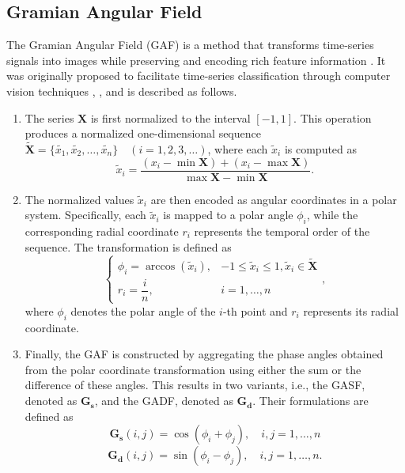\documentclass[anonymous]{iopjournal}
\begin{document}
\subsection{Gramian Angular Field}
The Gramian Angular Field (GAF) is a method that transforms time-series signals into images while preserving and encoding rich feature information \cite{11048665}. It was originally proposed to facilitate time-series classification through computer vision techniques \cite{10114345}, \cite{10281942}, and is described as follows.
\begin{enumerate}
\item The series $\boldsymbol{X}$ is first normalized to the interval \([-1,1]\). This operation produces a normalized one-dimensional sequence $\boldsymbol{\tilde X} = \{\tilde{x_1}, \tilde{x_2}, \ldots, \tilde{x_n}\} \quad (i = 1, 2, 3,\ldots)$, where each $\tilde{x}_i$ is computed as
\begin{equation}
	\tilde{x}_i = \frac{(x_i - \min \boldsymbol{X}) + (x_i - \max \boldsymbol{X})}{\max \boldsymbol{X} - \min \boldsymbol{X}}.
	\label{normalization}
\end{equation}
\item The normalized values $\tilde{x}_i$ are then encoded as angular coordinates in a polar system. Specifically, each $\tilde{x}_i$ is mapped to a polar angle $\phi_i$, while the corresponding radial coordinate $r_i$ represents the temporal order of the sequence. The transformation is defined as
\begin{equation}
	\begin{cases} 
		\phi_i = \arccos(\tilde{x}_i), & -1 \leq \tilde{x}_i \leq 1,  \tilde{x}_i \in \boldsymbol{\tilde X} \\
		r_i = \dfrac{i}{n}, & i = 1, \ldots, n 
	\end{cases},
	\label{cosine angle}
\end{equation}
where $\phi_i$ denotes the polar angle of the $i$-th point and $r_i$ represents its radial coordinate.
\item Finally, the GAF is constructed by aggregating the phase angles obtained from the polar coordinate transformation using either the sum or the difference of these angles. This results in two variants, i.e., the GASF, denoted as $\boldsymbol{G_s}$, and the GADF, denoted as $\boldsymbol{G_d}$. Their formulations are defined as
\begin{equation}
	\boldsymbol{G_s}(i,j) = \cos(\phi_i + \phi_j), \quad i,j = 1,\ldots,n
	\label{eq:gasf}
\end{equation}
\begin{equation}
	\boldsymbol{G_d}(i,j) = \sin(\phi_i - \phi_j), \quad i,j = 1,\ldots,n.
	\label{eq:gadf}
\end{equation}
\end{enumerate}
\end{document}
